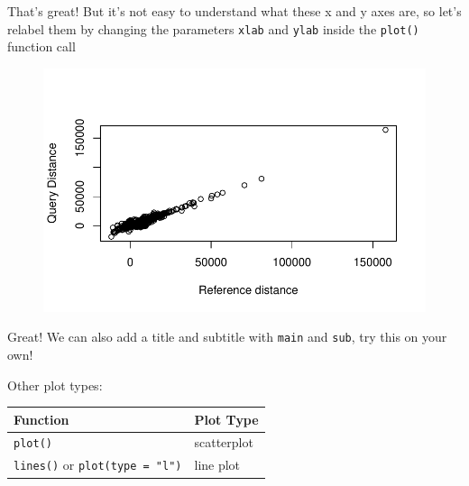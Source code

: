 \documentclass[
  letterpaper,
  DIV=11,
  numbers=noendperiod]{scrreprt}
\newenvironment{Shaded}{\begin{snugshade}}{\end{snugshade}}
\newcommand{\AttributeTok}[1]{\textcolor[rgb]{0.40,0.45,0.13}{#1}}
\newcommand{\DocumentationTok}[1]{\textcolor[rgb]{0.37,0.37,0.37}{\textit{#1}}}
\newcommand{\FunctionTok}[1]{\textcolor[rgb]{0.28,0.35,0.67}{#1}}
\newcommand{\NormalTok}[1]{\textcolor[rgb]{0.00,0.23,0.31}{#1}}
\newcommand{\SpecialCharTok}[1]{\textcolor[rgb]{0.37,0.37,0.37}{#1}}
\newcommand{\StringTok}[1]{\textcolor[rgb]{0.13,0.47,0.30}{#1}}
\begin{document}
That's great! But it's not easy to understand what these x and y axes
are, so let's relabel them by changing the parameters \texttt{xlab} and
\texttt{ylab} inside the \texttt{plot()} function call

\begin{Shaded}
\end{Shaded}

\begin{figure}[H]

{\centering \includegraphics{scripts/02_dataViz/class3_files/figure-pdf/unnamed-chunk-4-1.pdf}

}

\end{figure}

Great! We can also add a title and subtitle with \texttt{main} and
\texttt{sub}, try this on your own!

Other plot types:

\begin{longtable}[]{@{}ll@{}}
\toprule()
Function & Plot Type \\
\midrule()
\endhead
\texttt{plot()} & scatterplot \\
\texttt{lines()} or \texttt{plot(type\ =\ "l")} & line plot \\
\bottomrule()
\end{longtable}
\end{document}
